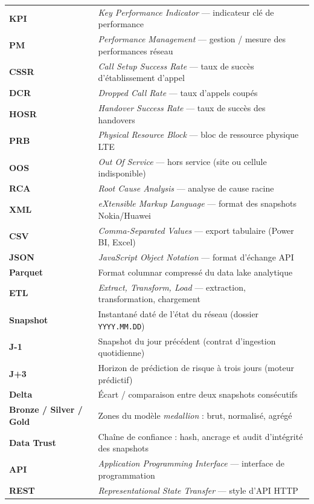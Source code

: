 \documentclass[12pt,a4paper]{report}
\begin{document}
\begin{longtable}{@{}p{3.4cm}p{10.3cm}@{}}
\textbf{KPI} & \textit{Key Performance Indicator} — indicateur clé de performance \\
\textbf{PM} & \textit{Performance Management} — gestion / mesure des performances réseau \\
\textbf{CSSR} & \textit{Call Setup Success Rate} — taux de succès d'établissement d'appel \\
\textbf{DCR} & \textit{Dropped Call Rate} — taux d'appels coupés \\
\textbf{HOSR} & \textit{Handover Success Rate} — taux de succès des handovers \\
\textbf{PRB} & \textit{Physical Resource Block} — bloc de ressource physique LTE \\
\textbf{OOS} & \textit{Out Of Service} — hors service (site ou cellule indisponible) \\
\textbf{RCA} & \textit{Root Cause Analysis} — analyse de cause racine \\
\textbf{XML} & \textit{eXtensible Markup Language} — format des snapshots Nokia/Huawei \\
\textbf{CSV} & \textit{Comma-Separated Values} — export tabulaire (Power BI, Excel) \\
\textbf{JSON} & \textit{JavaScript Object Notation} — format d'échange API \\
\textbf{Parquet} & Format columnar compressé du data lake analytique \\
\textbf{ETL} & \textit{Extract, Transform, Load} — extraction, transformation, chargement \\
\textbf{Snapshot} & Instantané daté de l'état du réseau (dossier \texttt{YYYY.MM.DD}) \\
\textbf{J-1} & Snapshot du jour précédent (contrat d'ingestion quotidienne) \\
\textbf{J+3} & Horizon de prédiction de risque à trois jours (moteur prédictif) \\
\textbf{Delta} & Écart / comparaison entre deux snapshots consécutifs \\
\textbf{Bronze / Silver / Gold} & Zones du modèle \textit{medallion} : brut, normalisé, agrégé \\
\textbf{Data Trust} & Chaîne de confiance : hash, ancrage et audit d'intégrité des snapshots \\
\textbf{API} & \textit{Application Programming Interface} — interface de programmation \\
\textbf{REST} & \textit{Representational State Transfer} — style d'API HTTP \\

\end{longtable}
\end{document}
